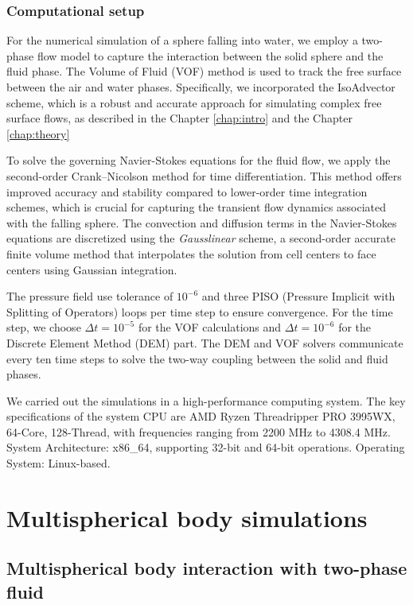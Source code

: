 \subsubsection{Computational setup}

For the numerical simulation of a sphere falling into water, we employ a two-phase flow model to capture the interaction between the solid sphere and the fluid phase. The Volume of Fluid (VOF) method is used to track the free surface between the air and water phases. Specifically, we incorporated the IsoAdvector \cite{roenby2019isoadvector} scheme, which is a robust and accurate approach for simulating complex free surface flows, as described in the Chapter \ref{chap:intro} and the Chapter \ref{chap:theory}

To solve the governing Navier-Stokes equations for the fluid flow, we apply the second-order Crank–Nicolson method for time differentiation. This method offers improved accuracy and stability compared to lower-order time integration schemes, which is crucial for capturing the transient flow dynamics associated with the falling sphere. The convection and diffusion terms in the Navier-Stokes equations are discretized using the \textit{Gausslinear} scheme, a second-order accurate finite volume method that interpolates the solution from cell centers to face centers using Gaussian integration.

The pressure field use tolerance of $10^{-6}$ and three PISO (Pressure Implicit with Splitting of Operators) loops per time step to ensure convergence. For the time step, we choose $\Delta t = 10^{-5}$ for the VOF calculations and $\Delta t = 10^{-6}$ for the Discrete Element Method (DEM) part. The DEM and VOF solvers communicate every ten time steps to solve the two-way coupling between the solid and fluid phases.

We carried out the simulations in a high-performance computing system. The key specifications of the system CPU are AMD Ryzen Threadripper PRO 3995WX, 64-Core, 128-Thread, with frequencies ranging from 2200 MHz to 4308.4 MHz. System Architecture: x86\_64, supporting 32-bit and 64-bit operations. Operating System: Linux-based.
\section{Multispherical body simulations}

\subsection{Multispherical body interaction with two-phase fluid}


